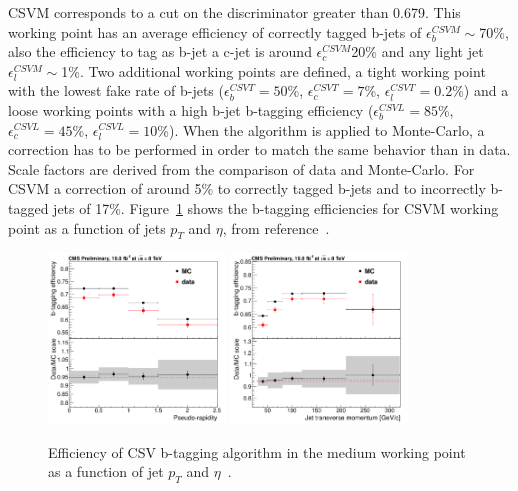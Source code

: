 CSVM corresponds to a cut on the discriminator greater than 0.679. This working point has an average efficiency of correctly tagged b-jets of $\epsilon^{CSVM}_{b}\sim$70\%, also the efficiency to tag as b-jet a c-jet is around $\epsilon^{CSVM}_{c}$20\% and any light jet $\epsilon^{CSVM}_{l}\sim$1\%. Two additional working points are defined, a tight working point with the lowest fake rate of b-jets ($\epsilon^{CSVT}_{b}=50$\%, $\epsilon^{CSVT}_{c}=7$\%, $\epsilon^{CSVT}_{l}=0.2$\%) and a loose working points with a high b-jet b-tagging efficiency ($\epsilon^{CSVL}_{b}=85$\%, $\epsilon^{CSVL}_{c}=45$\%, $\epsilon^{CSVL}_{l}=10$\%). When the algorithm is applied to Monte-Carlo, a correction has to be performed in order to match the same behavior than in data. Scale factors are derived from the comparison of data and Monte-Carlo. For CSVM a correction of around 5\% to correctly tagged b-jets and to incorrectly b-tagged jets of 17\%. Figure~\ref{fig:CSVEff} shows the b-tagging efficiencies for CSVM working point as a function of jets $p_{T}$ and $\eta$, from reference~\cite{CMS-PAS-BTV-13-001}.  

\begin{figure}[!Hhtbp]
  \begin{center}
    \includegraphics[width=0.42\textwidth]{figs/LTdilep_csvMeffeta.png}
    \includegraphics[width=0.42\textwidth]{figs/LTdilep_csvMeffpt.png}
    \caption{Efficiency of CSV b-tagging algorithm in the medium working point as a function of jet $p_{T}$ and $\eta$~\cite{CMS-PAS-BTV-13-001}.}
    \label{fig:CSVEff}
  \end{center}
\end{figure}


